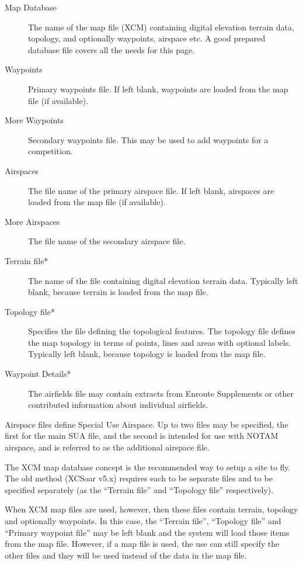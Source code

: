 \begin{description}
\item[Map Database]  The name of the map file (XCM) containing digital elevation
  terrain data, topology, and optionally waypoints, airspace etc. A good
  prepared database file covers all the needs for this page.
\item[Waypoints]  Primary waypoints file.  If left blank, waypoints are loaded
from the map file (if available).
\item[More Waypoints]  Secondary waypoints file.  This may be used to add waypoints for a competition.
\item[Airspaces]  The file name of the primary airspace file.  If left blank,
airspaces are loaded from the map file (if available).
\item[More Airspaces]  The file name of the secondary airspace file.
\item[Terrain file*]  The name of the file containing digital elevation
  terrain data.  Typically left blank, because terrain is loaded from the map
  file.
\item[Topology file*]  Specifies the file defining the topological features.
The topology file defines the map topology in terms of points, lines
and areas with optional labels.  Typically left blank, because topology is
loaded from the map file.
\item[Waypoint Details*]  The airfields file may contain extracts from Enroute Supplements or
other contributed information about individual airfields.
\end{description}

Airspace files define Special Use Airspace.  Up to two files may be
specified, the first for the main SUA file, and the second is intended
for use with NOTAM airspace, and is referred to as the additional
airspace file.

The XCM map database concept is the recommended way to setup a site to fly.
The old method (XCSoar v5.x) requires each to be separate files and to be
specified separately (as the ``Terrain file'' and ``Topology file'' respectively).  

When XCM map files are used, however, then these files contain terrain, topology
and optionally waypoints.  In this case, the ``Terrain file'', ``Topology file'' and 
``Primary waypoint file'' may be left blank and the system will load those items
from the map file. However, if a map file is used, the use can still specify the other
files and they will be used instead of the data in the map file.

